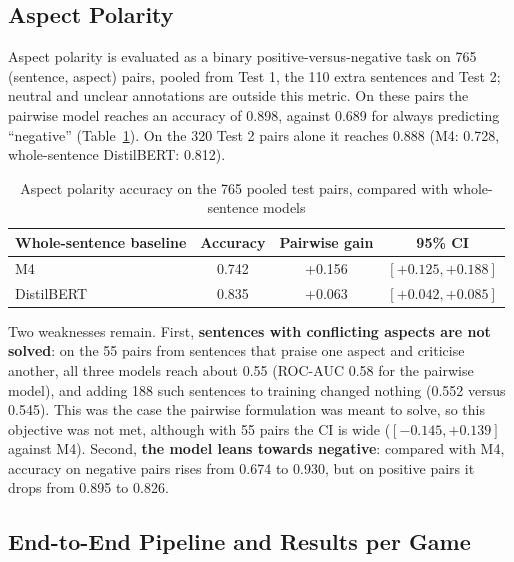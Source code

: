 \subsection{Aspect Polarity}

Aspect polarity is evaluated as a binary positive-versus-negative task on 765 (sentence, aspect) pairs, pooled from Test 1, the 110 extra sentences and Test 2; neutral and unclear annotations are outside this metric. On these pairs the pairwise model reaches an accuracy of 0.898, against 0.689 for always predicting ``negative'' (Table~\ref{tab:polarity}). On the 320 Test 2 pairs alone it reaches 0.888 (M4: 0.728, whole-sentence DistilBERT: 0.812).

\begin{table}[!htbp]
\centering
\caption{Aspect polarity accuracy on the 765 pooled test pairs, compared with whole-sentence models}
\label{tab:polarity}
\begin{tabular}{lccc}
\toprule
\textbf{Whole-sentence baseline} & \textbf{Accuracy} & \textbf{Pairwise gain} & \textbf{95\% CI} \\
\midrule
M4 & 0.742 & +0.156 & $[+0.125, +0.188]$ \\
DistilBERT & 0.835 & +0.063 & $[+0.042, +0.085]$ \\
\bottomrule
\end{tabular}
\end{table}

Two weaknesses remain. First, \textbf{sentences with conflicting aspects are not solved}: on the 55 pairs from sentences that praise one aspect and criticise another, all three models reach about 0.55 (ROC-AUC 0.58 for the pairwise model), and adding 188 such sentences to training changed nothing (0.552 versus 0.545). This was the case the pairwise formulation was meant to solve, so this objective was not met, although with 55 pairs the CI is wide ($[-0.145, +0.139]$ against M4). Second, \textbf{the model leans towards negative}: compared with M4, accuracy on negative pairs rises from 0.674 to 0.930, but on positive pairs it drops from 0.895 to 0.826.

\subsection{End-to-End Pipeline and Results per Game}

